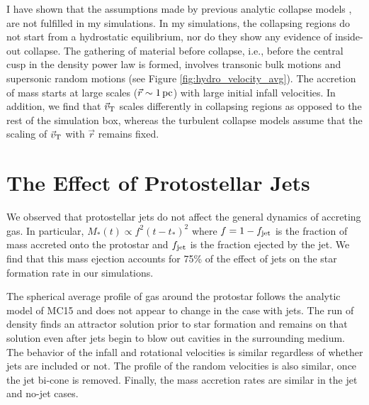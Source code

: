 \documentclass[../dissertation.tex]{subfiles}
\begin{document}
I have shown that the assumptions made by previous analytic collapse models
\citep{1977ApJ...214..488S,1992ApJ...396..631M,1997ApJ...476..750M,2003ApJ...585..850M}, 
are not fulfilled in my simulations. 
In my simulations, the collapsing regions do not start from a hydrostatic equilibrium, nor 
do they show any evidence of inside-out collapse. 
The gathering of material before collapse, i.e.,
before the central cusp in the density power law is formed, involves transonic bulk motions 
and supersonic random motions (see Figure \ref{fig:hydro_velocity_avg}). 
The accretion of mass starts at large scales ($\vec{r} \sim 1\,\rm pc$) with large initial infall velocities. 
In addition, we find that $\vec{v}_{\rm T}$ 
scales differently in collapsing regions as opposed to the rest of the simulation box, 
whereas the turbulent collapse models \citep{1997ApJ...476..750M,2003ApJ...585..850M} assume 
that the scaling of $\vec{v}_{\rm T}$ with $\vec{r}$ remains fixed.  


\section{The Effect of Protostellar Jets}

We observed that protostellar jets do not affect the general dynamics of accreting gas.
In particular, $M_*(t) \propto f^2 (t-t_*)^2$ where $f = 1 - f_{\rm jet}$ is the fraction of mass accreted onto the protostar and $f_{\rm jet}$ is the fraction ejected by the jet.
We find that this mass ejection accounts for 75\% of the effect of jets on the star formation rate in our simulations.

The spherical average profile of gas around the protostar follows the analytic model of MC15 and does not appear to change in the case with jets.
The run of density finds an attractor solution prior to star formation and remains on that solution even after jets begin to blow out cavities in the surrounding medium.
The behavior of the infall and rotational velocities is similar regardless of whether jets are included or not.
The profile of the random velocities is also similar, once the jet bi-cone is removed.  Finally, the mass accretion rates are similar in the jet and no-jet cases.
\end{document}
